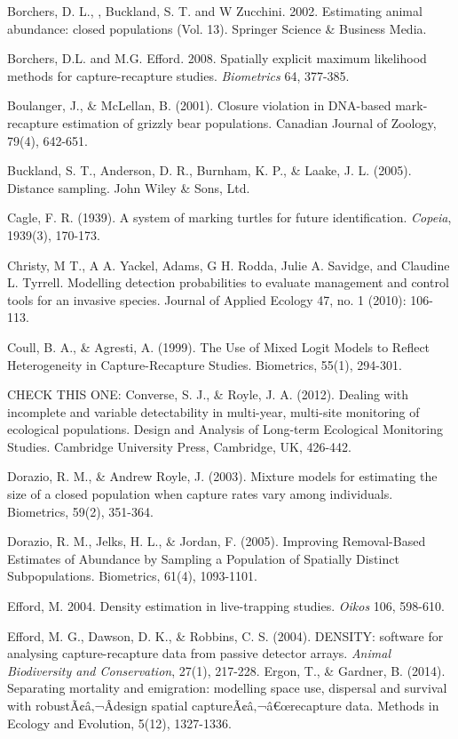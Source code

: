 \documentclass{book}
\begin{document}
\rf Borchers, D. L., , Buckland, S. T.  and W Zucchini. 2002. Estimating animal abundance: closed populations (Vol. 13). Springer Science \& Business Media.

\rf Borchers, D.L. and M.G. Efford. 2008. Spatially explicit maximum likelihood methods for capture-recapture studies. {\it Biometrics} 64, 377-385.

\rf Boulanger, J., \& McLellan, B. (2001). Closure violation in DNA-based mark-recapture estimation of grizzly bear populations. Canadian Journal of Zoology, 79(4), 642-651.

\rf Buckland, S. T., Anderson, D. R., Burnham, K. P., \& Laake, J. L. (2005). Distance sampling. John Wiley \& Sons, Ltd.

Cagle, F. R. (1939). A system of marking turtles for future identification. \textit{Copeia}, 1939(3), 170-173.

\rf Christy, M T., A A. Yackel, Adams, G H. Rodda, Julie A. Savidge, and Claudine L. Tyrrell. Modelling detection probabilities to evaluate management and control tools for an invasive species. Journal of Applied Ecology 47, no. 1 (2010): 106-113.

\rf Coull, B. A., \& Agresti, A. (1999). The Use of Mixed Logit Models to Reflect Heterogeneity in Capture-Recapture Studies. Biometrics, 55(1), 294-301.

CHECK THIS ONE:
\rf Converse, S. J., \& Royle, J. A. (2012). Dealing with incomplete and variable detectability in multi-year, multi-site monitoring of ecological populations. Design and Analysis of Long-term Ecological Monitoring Studies. Cambridge University Press, Cambridge, UK, 426-442.

\rf Dorazio, R. M., \& Andrew Royle, J. (2003). Mixture models for estimating the size of a closed population when capture rates vary among individuals. Biometrics, 59(2), 351-364.

\rf Dorazio, R. M., Jelks, H. L., \& Jordan, F. (2005). Improving Removal-Based Estimates of Abundance by Sampling a Population of Spatially Distinct Subpopulations. Biometrics, 61(4), 1093-1101.

\rf Efford, M. 2004. Density estimation in live-trapping studies. {\it Oikos}  106, 598-610.

\rf Efford, M. G., Dawson, D. K., \& Robbins, C. S. (2004). DENSITY: software for analysing capture-recapture data from passive detector arrays. \textit{Animal Biodiversity and Conservation}, 27(1), 217-228.
\rf Ergon, T., \& Gardner, B. (2014). Separating mortality and emigration: modelling space use, dispersal and survival with robustÃ¢â‚¬Âdesign spatial captureÃ¢â‚¬â€œrecapture data. Methods in Ecology and Evolution, 5(12), 1327-1336.
\end{document}
